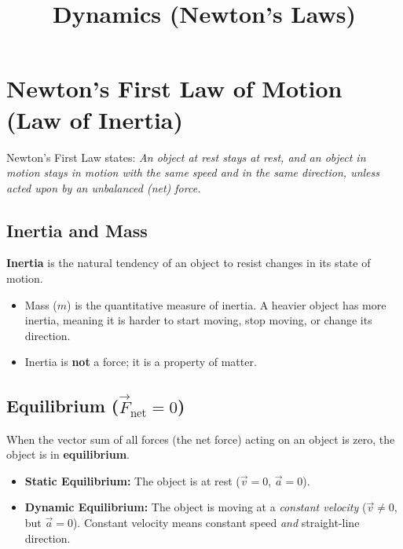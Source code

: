 \documentclass{article}
\begin{document}
\title{Dynamics (Newton's Laws)}
\author{}
\date{}
\maketitle


\section{Newton's First Law of Motion (Law of Inertia)}

Newton's First Law states: \emph{An object at rest stays at rest, and an object in motion stays in motion with the same speed and in the same direction, unless acted upon by an unbalanced (net) force.}

\subsection{Inertia and Mass}
\textbf{Inertia} is the natural tendency of an object to resist changes in its state of motion.
\begin{itemize}
    \item Mass ($m$) is the quantitative measure of inertia. A heavier object has more inertia, meaning it is harder to start moving, stop moving, or change its direction.
    \item Inertia is \textbf{not} a force; it is a property of matter.
\end{itemize}

\subsection{Equilibrium ($\vec{F}_{\text{net}} = 0$)}
When the vector sum of all forces (the net force) acting on an object is zero, the object is in \textbf{equilibrium}.
\begin{itemize}
    \item \textbf{Static Equilibrium:} The object is at rest ($\vec{v} = 0$, $\vec{a} = 0$).
    \item \textbf{Dynamic Equilibrium:} The object is moving at a \emph{constant velocity} ($\vec{v} \neq 0$, but $\vec{a} = 0$). Constant velocity means constant speed \emph{and} straight-line direction.
\end{itemize}
\end{document}
